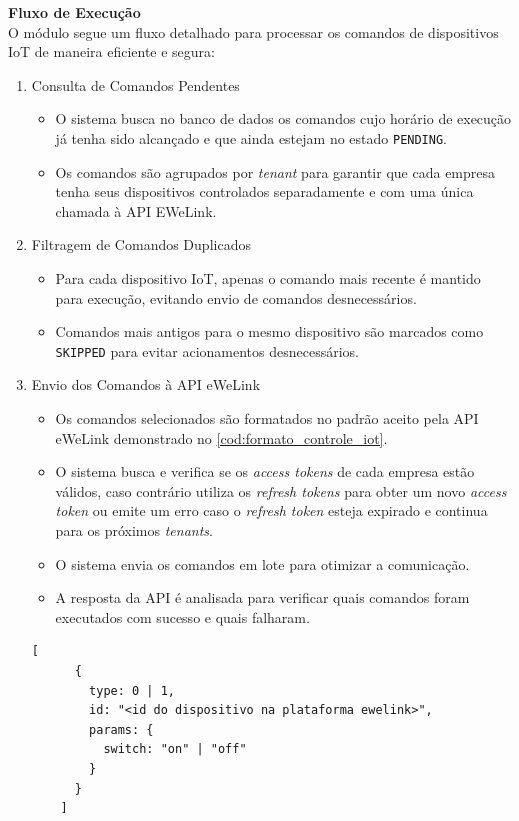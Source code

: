 \noindent\textbf{Fluxo de Execução}\\
O módulo segue um fluxo detalhado para processar os comandos de dispositivos IoT de maneira eficiente e segura:

\begin{enumerate}
  \item Consulta de Comandos Pendentes
  \begin{itemize}
      \item O sistema busca no banco de dados os comandos cujo horário de execução já tenha sido alcançado e que ainda estejam no estado \texttt{PENDING}.
      \item Os comandos são agrupados por \textit{tenant} para garantir que cada empresa tenha seus dispositivos controlados separadamente e com uma única chamada à API EWeLink.
  \end{itemize}
  
  \item Filtragem de Comandos Duplicados
  \begin{itemize}
      \item Para cada dispositivo IoT, apenas o comando mais recente é mantido para execução, evitando envio de comandos desnecessários.
      \item Comandos mais antigos para o mesmo dispositivo são marcados como \texttt{SKIPPED} para evitar acionamentos desnecessários.
  \end{itemize}
  
  \item Envio dos Comandos à API eWeLink
  \begin{itemize}
      \item Os comandos selecionados são formatados no padrão aceito pela API eWeLink demonstrado no \autoref{cod:formato_controle_iot}.
      \item O sistema busca e verifica se os \textit{access tokens} de cada empresa estão válidos, caso contrário utiliza os \textit{refresh tokens} para obter um novo \textit{access token} ou emite um erro caso o \textit{refresh token} esteja expirado e continua para os próximos \textit{tenants}.
      \item O sistema envia os comandos em lote para otimizar a comunicação.
      \item A resposta da API é analisada para verificar quais comandos foram executados com sucesso e quais falharam.
  \end{itemize}

  \begin{lstlisting}[caption={Formato de envio de comando para \acrshort{API}.},label={cod:formato_controle_iot}]
    [
      {
        type: 0 | 1,
        id: "<id do dispositivo na plataforma ewelink>",
        params: {
          switch: "on" | "off"
        }
      }
    ]
  \end{lstlisting}


\end{enumerate}
